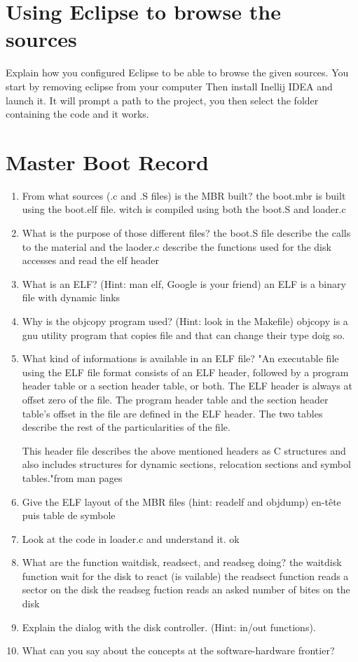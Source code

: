 \documentclass[10]{article}
\begin{document}
\page

\section{Using Eclipse to browse the sources} 

Explain how you configured Eclipse to be able to browse the given sources.
You start by removing eclipse from your computer
Then install Inellij IDEA and launch it.
It will prompt a path to the project, you then select the folder containing the code and it works.

\section{Master Boot Record}

\begin{enumerate}
\item
From what sources (.c and .S files) is the MBR built?
the boot.mbr is built using the boot.elf file. witch is compiled using both the boot.S and loader.c
\item
What is the purpose of those different files?
the boot.S file describe the calls to the material and the laoder.c describe the functions used for the disk accesses and read the elf header
\item
What is an ELF? (Hint: man elf, Google is your friend) 
an ELF is a binary file with dynamic links
\item
Why is the objcopy program used? (Hint: look in the Makefile)
objcopy is a gnu utility program that copies file and that can change their type doig so.
\item
What kind of informations is available in an ELF file?
"An executable file using the ELF file format consists of an ELF header, followed by a program header table or a section header table, or both. The ELF header is always at offset zero of the file. The program header table and the section header table's offset in the file are defined in the ELF header. The two tables describe the rest of the particularities of the file.

This header file describes the above mentioned headers as C structures and also includes structures for dynamic sections, relocation sections and symbol tables."from man pages
\item
Give the ELF layout of the MBR files (hint: readelf and objdump) 
en-tête puis table de symbole
\item
Look at the code in loader.c and understand it. 
ok
\item
What are the function waitdisk, readsect, and readseg doing?
the waitdisk function wait for the disk to react (is vailable)
the readsect function reads a sector on the disk
the readseg fuction reads an asked number of bites on the disk
\item
Explain the dialog with the disk controller. (Hint: in/out functions).

\item
What can you say about the concepts at the software-hardware frontier?
\end{enumerate}
\end{document}
